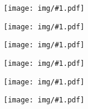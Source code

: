 \documentclass[12pt]{report}
\newcommand{\figura}[1] {
    \begin{figure}[!htbp]
      \begin{center}
        \texttt{[image: img/\#1.pdf]}
      \end{center}
    \end{figure}
}
\newcommand{\quadrinhos}[1] {
    \figura{quad#1}
}
\begin{document}
\renewcommand{\contentsname}{\center Esse guia contém...}

\figura{Capa}
\clearpage
\newpage

\tableofcontents
\newpage




\quadrinhos{1}




\quadrinhos{2}




\quadrinhos{6}


\quadrinhos{7}


\quadrinhos{3}














\end{document}
